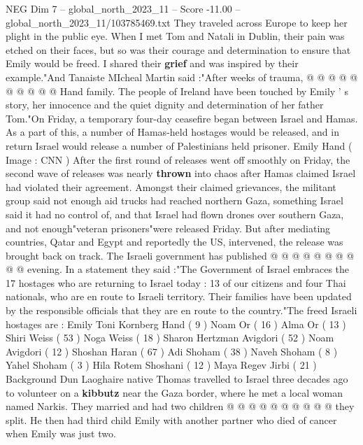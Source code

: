 \begin{textsample}{NEG Dim 7 – global\_north\_2023\_11 – Score -11.00 – global\_north\_2023\_11/103785469.txt}
They traveled across Europe to keep her plight in the public eye.
When I met Tom and Natali in Dublin, their pain was etched on their faces, but so was their courage and determination to ensure that Emily would be freed.
I shared their \textbf{grief} and was inspired by their example."And Tanaiste MIcheal Martin said :"After weeks of trauma, @ @ @ @ @ @ @ @ @ @ Hand family.
The people of Ireland have been touched by Emily ' s story, her innocence and the quiet dignity and determination of her father Tom."On Friday, a temporary four-day ceasefire began between Israel and Hamas.
As a part of this, a number of Hamas-held hostages would be released, and in return Israel would release a number of Palestinians held prisoner.
Emily Hand ( Image : CNN ) After the first round of releases went off smoothly on Friday, the second wave of releases was nearly \textbf{thrown} into chaos after Hamas claimed Israel had violated their agreement.
Amongst their claimed grievances, the militant group said not enough aid trucks had reached northern Gaza, something Israel said it had no control of, and that Israel had flown drones over southern Gaza, and not enough"veteran prisoners"were released Friday.
But after mediating countries, Qatar and Egypt and reportedly the US, intervened, the release was brought back on track.
The Israeli government has published @ @ @ @ @ @ @ @ @ @ evening.
In a statement they said :"The Government of Israel embraces the 17 hostages who are returning to Israel today : 13 of our citizens and four Thai nationals, who are en route to Israeli territory.
Their families have been updated by the responsible officials that they are en route to the country."The freed Israeli hostages are : Emily Toni Kornberg Hand ( 9 ) Noam Or ( 16 ) Alma Or ( 13 ) Shiri Weiss ( 53 ) Noga Weiss ( 18 ) Sharon Hertzman Avigdori ( 52 ) Noam Avigdori ( 12 ) Shoshan Haran ( 67 ) Adi Shoham ( 38 ) Naveh Shoham ( 8 ) Yahel Shoham ( 3 ) Hila Rotem Shoshani ( 12 ) Maya Regev Jirbi ( 21 ) Background Dun Laoghaire native Thomas travelled to Israel three decades ago to volunteer on a \textbf{kibbutz} near the Gaza border, where he met a local woman named Narkis.
They married and had two children @ @ @ @ @ @ @ @ @ @ they split.
He then had third child Emily with another partner who died of cancer when Emily was just two.

\end{textsample}
